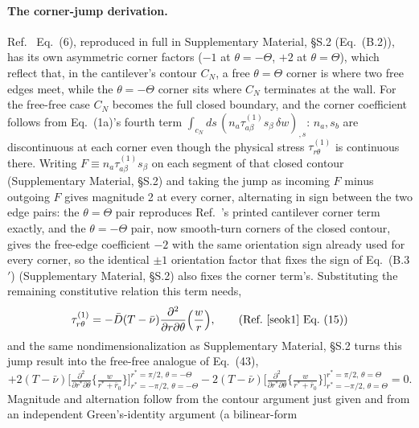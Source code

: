 \documentclass[11pt]{article}
\begin{document}
\paragraph{The corner-jump derivation.} Ref.~\cite{seok1} Eq.~(6),
reproduced in full in Supplementary Material, §S.2 (Eq.~(B.2)), has
its own asymmetric corner factors ($-1$ at $\theta=-\Theta$, $+2$ at
$\theta=\Theta$), which reflect that, in the cantilever's contour $C_N$,
a free $\theta=\Theta$ corner is where two free edges meet, while the
$\theta=-\Theta$ corner sits where $C_N$ terminates at the wall. For the
free-free case $C_N$ becomes the full closed boundary, and the corner
coefficient follows from Eq.~(1a)'s fourth term
$\int_{c_N}\!ds\,(n_a\tau^{(1)}_{a\beta}s_\beta\,\delta w)_{,s}$:
$n_a,s_b$ are discontinuous at each corner even though the physical
stress $\tau^{(1)}_{r\theta}$ is continuous there. Writing
$F\equiv n_a\tau^{(1)}_{a\beta}s_\beta$ on each segment of that closed
contour (Supplementary Material, §S.2) and taking the jump as incoming
$F$ minus outgoing $F$ gives magnitude 2 at every corner, alternating in
sign between the two edge pairs: the $\theta=\Theta$ pair reproduces
Ref.~\cite{seok1}'s printed cantilever corner term exactly, and the
$\theta=-\Theta$ pair, now smooth-turn corners of the closed contour,
gives the free-edge coefficient $-2$ with the same orientation sign
already used for every corner, so the identical $\pm1$ orientation factor
that fixes the sign of Eq.~(B.3$'$) (Supplementary Material, §S.2) also
fixes the corner term's. Substituting
the remaining constitutive relation this term needs,
\begin{equation}
\tau^{(1)}_{r\theta}=-\bar D(T-\bar\nu)\frac{\partial^2}{\partial
r\partial\theta}\Big(\frac{w}{r}\Big),
\tag{Ref.~\cite{seok1} Eq.~(15)}
\end{equation}
and the same nondimensionalization as Supplementary Material, §S.2
turns this jump result into the free-free analogue of Eq.~(43),
\begin{equation}
+2(T-\bar\nu)\Big[\tfrac{\partial^2}{\partial r^{*}\partial\theta}
\Big\{\tfrac{w}{r^{*}+\bar r_0}\Big\}\Big]_{r^{*}=-\pi/2,\,\theta=-\Theta}^{r^{*}=\pi/2,\,\theta=-\Theta}
-2(T-\bar\nu)\Big[\tfrac{\partial^2}{\partial r^{*}\partial\theta}
\Big\{\tfrac{w}{r^{*}+\bar r_0}\Big\}\Big]_{r^{*}=-\pi/2,\,\theta=\Theta}^{r^{*}=\pi/2,\,\theta=\Theta}=0.
\label{eq:corner-jump-result}
\end{equation}
Magnitude and alternation follow from the contour argument just given
and from an independent Green's-identity argument (a bilinear-form
\end{document}

